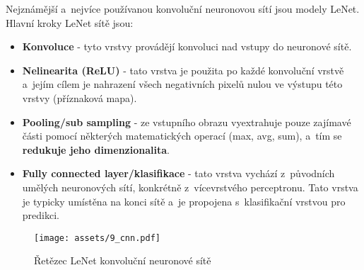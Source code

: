 Nejznámější a~nejvíce používanou konvoluční neuronovou sítí jsou modely LeNet.
Hlavní kroky LeNet sítě jsou:
\begin{itemize}
    \item{\textbf{Konvoluce} - tyto vrstvy provádějí konvoluci nad vstupy do neuronové sítě.}
    \item{\textbf{Nelinearita (ReLU)} - tato vrstva je použita po každé konvoluční vrstvě a~jejím cílem je nahrazení všech negativních pixelů nulou ve výstupu této vrstvy (příznaková mapa).}
    \item{\textbf{Pooling/sub sampling} - ze vstupního obrazu vyextrahuje pouze zajímavé části pomocí některých matematických operací (max, avg, sum), a~tím se \textbf{redukuje jeho dimenzionalita}.}
    \item{\textbf{Fully connected layer/klasifikace} - tato vrstva vychází z~původních umělých neuronových sítí, konkrétně z~vícevrstvého perceptronu. Tato vrstva je typicky umístěna na konci sítě a~je propojena s~klasifikační vrstvou pro predikci.}
\end{itemize}
\begin{figure}[H]
    \centering
    \texttt{[image: assets/9\_cnn.pdf]}
    \caption{Řetězec LeNet konvoluční neuronové sítě}
    \label{fig:cnn}
\end{figure}